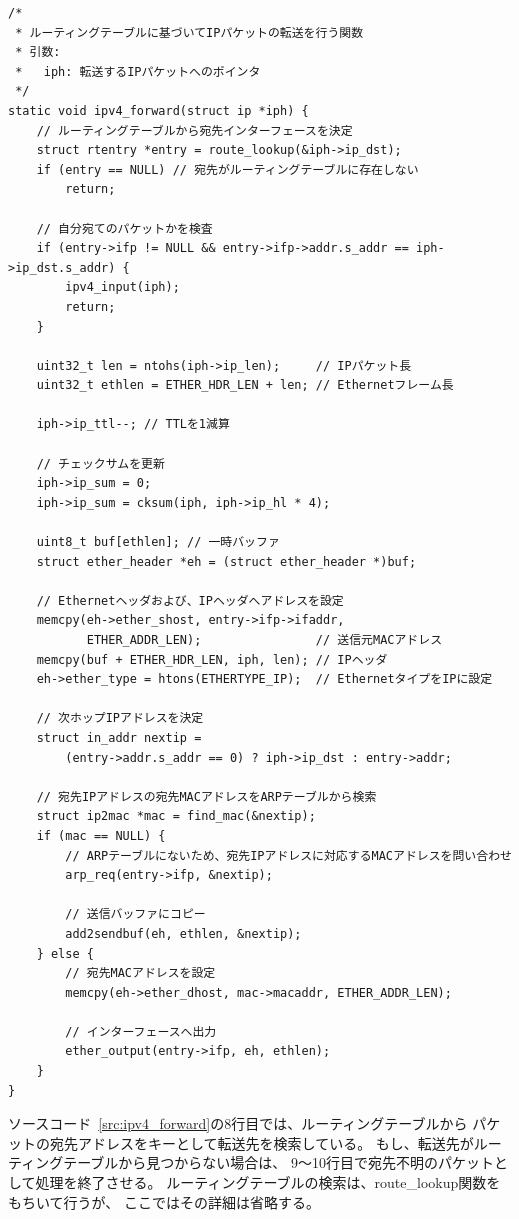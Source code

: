 \begin{lstlisting}[caption=ipv4\_forward関数,label=src:ipv4_forward]
/*
 * ルーティングテーブルに基づいてIPパケットの転送を行う関数
 * 引数:
 *   iph: 転送するIPパケットへのポインタ
 */
static void ipv4_forward(struct ip *iph) {
    // ルーティングテーブルから宛先インターフェースを決定
    struct rtentry *entry = route_lookup(&iph->ip_dst);
    if (entry == NULL) // 宛先がルーティングテーブルに存在しない
        return;

    // 自分宛てのパケットかを検査
    if (entry->ifp != NULL && entry->ifp->addr.s_addr == iph->ip_dst.s_addr) {
        ipv4_input(iph);
        return;
    }

    uint32_t len = ntohs(iph->ip_len);     // IPパケット長
    uint32_t ethlen = ETHER_HDR_LEN + len; // Ethernetフレーム長

    iph->ip_ttl--; // TTLを1減算

    // チェックサムを更新
    iph->ip_sum = 0;
    iph->ip_sum = cksum(iph, iph->ip_hl * 4);

    uint8_t buf[ethlen]; // 一時バッファ
    struct ether_header *eh = (struct ether_header *)buf;

    // Ethernetヘッダおよび、IPヘッダへアドレスを設定
    memcpy(eh->ether_shost, entry->ifp->ifaddr,
           ETHER_ADDR_LEN);                // 送信元MACアドレス
    memcpy(buf + ETHER_HDR_LEN, iph, len); // IPヘッダ
    eh->ether_type = htons(ETHERTYPE_IP);  // EthernetタイプをIPに設定

    // 次ホップIPアドレスを決定
    struct in_addr nextip =
        (entry->addr.s_addr == 0) ? iph->ip_dst : entry->addr;

    // 宛先IPアドレスの宛先MACアドレスをARPテーブルから検索
    struct ip2mac *mac = find_mac(&nextip);
    if (mac == NULL) {
        // ARPテーブルにないため、宛先IPアドレスに対応するMACアドレスを問い合わせ
        arp_req(entry->ifp, &nextip);

        // 送信バッファにコピー
        add2sendbuf(eh, ethlen, &nextip);
    } else {
        // 宛先MACアドレスを設定
        memcpy(eh->ether_dhost, mac->macaddr, ETHER_ADDR_LEN);

        // インターフェースへ出力
        ether_output(entry->ifp, eh, ethlen);
    }
}
\end{lstlisting}

ソースコード~\ref{src:ipv4_forward}の8行目では、ルーティングテーブルから
パケットの宛先アドレスをキーとして転送先を検索している。
もし、転送先がルーティングテーブルから見つからない場合は、
9〜10行目で宛先不明のパケットとして処理を終了させる。
ルーティングテーブルの検索は、route\_lookup関数をもちいて行うが、
ここではその詳細は省略する。

